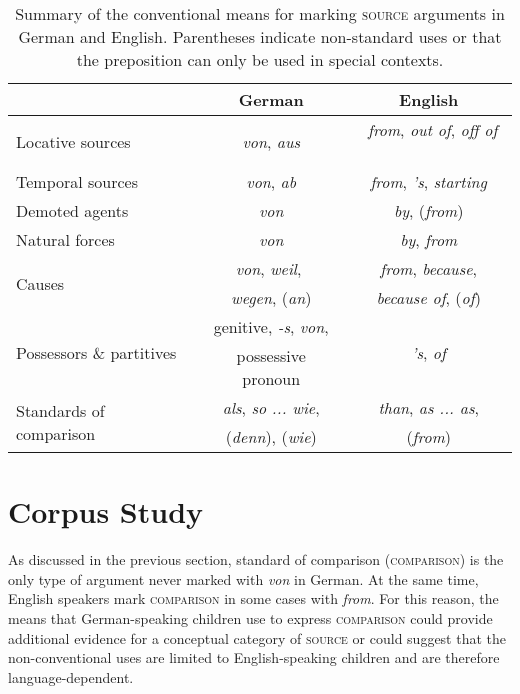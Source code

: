 \documentclass[lucida]{sp} %
\begin{document}
\begin{table}
\begin{tabularx}{\textwidth}{l | c | c}
& \textbf{German} & \textbf{English} \\ \midrule
Locative sources & \textit{von}, \textit{aus} &\ \textit{from}, \textit{out of}, \textit{off of} \ \\ \hline
Temporal sources & \textit{von}, \textit{ab} & \textit{from}, \textit{'s}, \textit{starting} \\ \hline
Demoted agents & \textit{von} & \textit{by}, (\textit{from}) \\ \hline
Natural forces & \textit{von} & \textit{by}, \textit{from} \\ \hline
\multirow{2}{*}{Causes} &\  \textit{von}, \textit{weil},  \  & \textit{from}, \textit{because}, \\
& \textit{wegen}, (\textit{an}) & \textit{because of}, (\textit{of})  \\ \hline
\multirow{2}{*}{Possessors \& partitives} & {genitive, \textit{-s}, \textit{von}, } &  \multirow{2}{*}{\textit{'s}, \textit{of}  } \\ 
& possessive pronoun & \\ \hline
\multirow{2}{*}{Standards of comparison} \ \ \ & \textit{als}, \textit{so ... wie}, & \textit{than}, \textit{as ... as},  \\
&  (\textit{denn}), (\textit{wie}) & (\textit{from}) \\
\end{tabularx}
\caption{Summary of the conventional means for marking \textsc{source} arguments in German and English. Parentheses indicate non-standard uses or that the preposition can only be used in special contexts.}\label{tbl:prep-summary}
\end{table}

\section{Corpus Study}
\label{sec:corpus}

As discussed in the previous section, standard of comparison (\textsc{comparison}) is the only type of argument never marked with \textit{von} in German. At the same time, English speakers mark \textsc{comparison} in some cases with \textit{from}. For this reason, the means that German-speaking children use to express \textsc{comparison} could provide additional evidence for a conceptual category of \textsc{source} or could suggest that the non-conventional uses are limited to English-speaking children and are therefore language-dependent.
\end{document}
